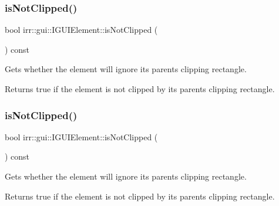 \subsubsection{\texorpdfstring{is\+Not\+Clipped()}{isNotClipped()}\hspace{0.1cm}{\footnotesize\ttfamily [1/2]}}
{\footnotesize\ttfamily bool irr\+::gui\+::\+I\+G\+U\+I\+Element\+::is\+Not\+Clipped (\begin{DoxyParamCaption}{ }\end{DoxyParamCaption}) const\hspace{0.3cm}{\ttfamily [inline]}}



Gets whether the element will ignore its parent\textquotesingle{}s clipping rectangle. 

\begin{DoxyReturn}{Returns}
true if the element is not clipped by its parent\textquotesingle{}s clipping rectangle. 
\end{DoxyReturn}
\mbox{\label{classirr_1_1gui_1_1IGUIElement_a940fcf886f9ae1e4bc719e19057018a2}} 
\subsubsection{\texorpdfstring{is\+Not\+Clipped()}{isNotClipped()}\hspace{0.1cm}{\footnotesize\ttfamily [2/2]}}
{\footnotesize\ttfamily bool irr\+::gui\+::\+I\+G\+U\+I\+Element\+::is\+Not\+Clipped (\begin{DoxyParamCaption}{ }\end{DoxyParamCaption}) const\hspace{0.3cm}{\ttfamily [inline]}}



Gets whether the element will ignore its parent\textquotesingle{}s clipping rectangle. 

\begin{DoxyReturn}{Returns}
true if the element is not clipped by its parent\textquotesingle{}s clipping rectangle. 
\end{DoxyReturn}
\mbox{\label{classirr_1_1gui_1_1IGUIElement_a1aaf30a10b77f192dda8c548c109de89}} 
